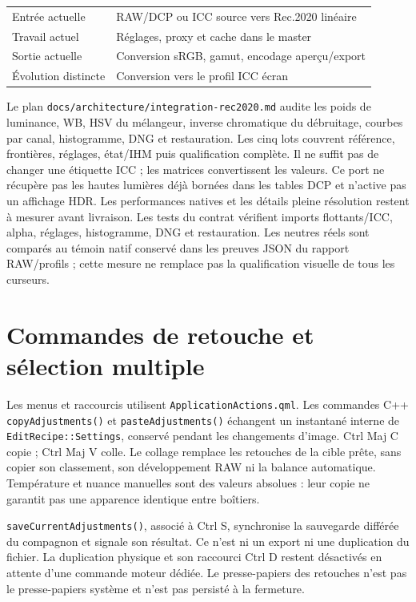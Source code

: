\begin{center}
\begin{tabular}{ll}
Entrée actuelle & RAW/DCP ou ICC source vers Rec.2020 linéaire \\
Travail actuel & Réglages, proxy et cache dans le master \\
Sortie actuelle & Conversion sRGB, gamut, encodage aperçu/export \\
Évolution distincte & Conversion vers le profil ICC écran
\end{tabular}
\end{center}

Le plan \texttt{docs/architecture/integration-rec2020.md} audite les poids
de luminance, WB, HSV du mélangeur, inverse chromatique du débruitage,
courbes par canal, histogramme, DNG et restauration. Les cinq lots couvrent
référence, frontières, réglages, état/IHM puis qualification complète.
Il ne suffit pas de changer une étiquette ICC ; les matrices convertissent
les valeurs. Ce port ne récupère pas les hautes lumières déjà bornées dans
les tables DCP et n'active pas un affichage HDR. Les performances natives
et les détails pleine résolution restent à mesurer avant livraison. Les tests
du contrat vérifient imports flottants/ICC, alpha, réglages, histogramme,
DNG et restauration. Les neutres réels sont comparés au témoin natif conservé
dans les preuves JSON du rapport RAW/profils ; cette mesure ne remplace pas
la qualification visuelle de tous les curseurs.

\section{Commandes de retouche et sélection multiple}

Les menus et raccourcis utilisent \texttt{ApplicationActions.qml}.
Les commandes C++
\texttt{copyAdjustments()} et \texttt{pasteAdjustments()} échangent un
instantané interne de \texttt{EditRecipe::Settings}, conservé pendant les
changements d'image. Ctrl Maj C copie ; Ctrl Maj V colle. Le collage remplace
les retouches de la cible prête, sans copier son classement, son développement
RAW ni la balance automatique. Température et nuance manuelles sont des valeurs
absolues : leur copie ne garantit pas une apparence identique entre boîtiers.

\texttt{saveCurrentAdjustments()}, associé à Ctrl S, synchronise la sauvegarde
différée du compagnon et signale son résultat. Ce n'est ni un export ni une
duplication du fichier. La duplication physique et son raccourci Ctrl D restent
désactivés en attente d'une commande moteur dédiée. Le presse-papiers des
retouches n'est pas le presse-papiers système et n'est pas persisté à la fermeture.


